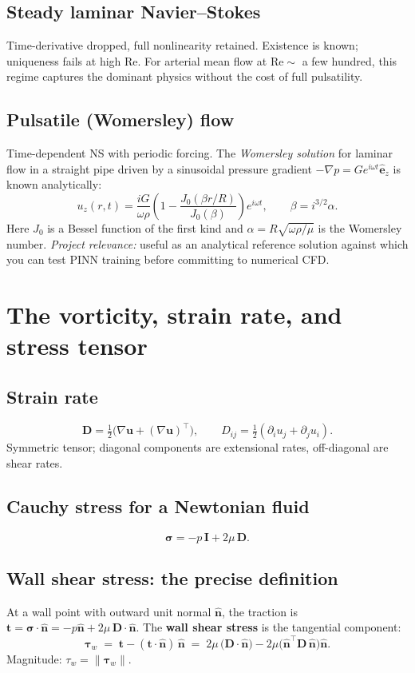 \documentclass[11pt]{article}
\begin{document}
\subsection*{Steady laminar Navier--Stokes}
Time-derivative dropped, full nonlinearity retained. Existence is known; uniqueness fails at high Re. For arterial mean flow at $\mathrm{Re} \sim$ a few hundred, this regime captures the dominant physics without the cost of full pulsatility.

\subsection*{Pulsatile (Womersley) flow}
Time-dependent NS with periodic forcing. The \emph{Womersley solution} for laminar flow in a straight pipe driven by a sinusoidal pressure gradient $-\nabla p = G e^{i\omega t}\hat{\mathbf{e}}_z$ is known analytically:
\[
u_z(r, t) = \frac{i G}{\omega \rho} \!\left(1 - \frac{J_0(\beta r/R)}{J_0(\beta)}\right)\! e^{i\omega t}, \qquad \beta = i^{3/2}\alpha.
\]
Here $J_0$ is a Bessel function of the first kind and $\alpha = R\sqrt{\omega \rho/\mu}$ is the Womersley number. \textit{Project relevance:} useful as an analytical reference solution against which you can test PINN training before committing to numerical CFD.

\section{The vorticity, strain rate, and stress tensor}

\subsection*{Strain rate}
\[
\mathbf{D} = \tfrac{1}{2}\!\big(\nabla\mathbf{u} + (\nabla\mathbf{u})^\top\big), \qquad D_{ij} = \tfrac{1}{2}(\partial_i u_j + \partial_j u_i).
\]
Symmetric tensor; diagonal components are extensional rates, off-diagonal are shear rates.

\subsection*{Cauchy stress for a Newtonian fluid}
\[
\boldsymbol{\sigma} = -p\,\mathbf{I} + 2\mu\,\mathbf{D}.
\]

\subsection*{Wall shear stress: the precise definition}
At a wall point with outward unit normal $\hat{\mathbf{n}}$, the traction is $\mathbf{t} = \boldsymbol{\sigma}\cdot\hat{\mathbf{n}} = -p\hat{\mathbf{n}} + 2\mu\,\mathbf{D}\cdot\hat{\mathbf{n}}$. The \textbf{wall shear stress} is the tangential component:
\begin{equation}
\boldsymbol{\tau}_w \;=\; \mathbf{t} - (\mathbf{t}\cdot\hat{\mathbf{n}})\,\hat{\mathbf{n}} \;=\; 2\mu\,\big(\mathbf{D}\cdot\hat{\mathbf{n}}\big) - 2\mu\big(\hat{\mathbf{n}}^\top \mathbf{D}\,\hat{\mathbf{n}}\big)\hat{\mathbf{n}}.
\label{eq:WSS}
\end{equation}
Magnitude: $\tau_w = \|\boldsymbol{\tau}_w\|$.
\end{document}
